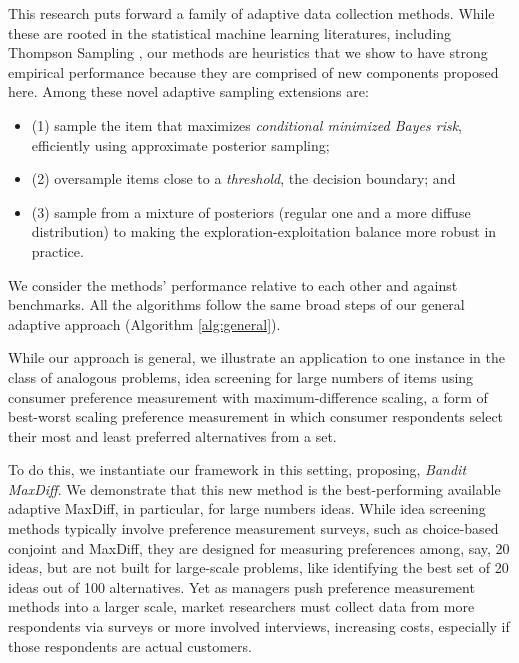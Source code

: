\documentclass[nonblindrev]{informs3}
\begin{document}
This research puts forward a family of adaptive data collection methods. While these are rooted in the statistical machine learning literatures, including Thompson Sampling \citep{thompson1933likelihood}, our methods are heuristics that we show to have strong empirical performance because they are comprised of new components proposed here. Among these novel adaptive sampling extensions are: 
\begin{itemize}
\item (1) sample the item that maximizes \emph{conditional minimized Bayes risk}, efficiently using approximate posterior sampling; 
\item (2) oversample items close to a \emph{threshold}, the decision boundary; and 
\item (3) sample from a mixture of posteriors (regular one and a more diffuse distribution) to making the exploration-exploitation balance more robust in practice.
\end{itemize}
We consider the methods' performance relative to each other and against benchmarks. All the algorithms follow the same broad steps of our general adaptive approach (Algorithm \ref{alg:general}).

While our approach is general, we illustrate an application to one instance in the class of analogous problems, idea screening for large numbers of items using consumer preference measurement with maximum-difference scaling, a form of best-worst scaling preference measurement in which consumer respondents select their most and least preferred alternatives from a set. 

To do this, we instantiate our framework in this setting, proposing, \emph{Bandit MaxDiff}. We demonstrate that this new method is the best-performing available adaptive MaxDiff, in particular, for large numbers ideas. While idea screening methods typically involve preference measurement surveys, such as choice-based conjoint and MaxDiff, they are designed for measuring preferences among, say, 20 ideas, but are not built for large-scale problems, like identifying the best set of 20 ideas out of 100 alternatives. Yet as managers push preference measurement methods into a larger scale, market researchers must collect data from more respondents via surveys or more involved interviews, increasing costs, especially if those respondents are actual customers.
\end{document}
